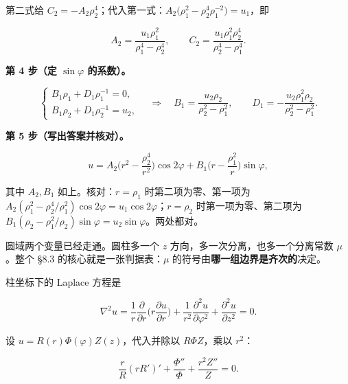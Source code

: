 \documentclass[11pt]{ctexart}
\let\origsubhdr\subhdr
\renewcommand{\subhdr}[1]{\par\needspace{3\baselineskip}\origsubhdr{#1}}
\let\orighdr\hdr
\renewcommand{\hdr}[2]{\par\needspace{6\baselineskip}\orighdr{#1}{#2}}
\begin{document}
第二式给 $C_2=-A_2\rho_2^4$；代入第一式：$A_2\big(\rho_1^2-\rho_2^4\rho_1^{-2}\big)=u_1$，即

\[
A_2=\frac{u_1\rho_1^2}{\rho_1^4-\rho_2^4},\qquad C_2=\frac{u_1\rho_1^2\rho_2^4}{\rho_2^4-\rho_1^4}.
\]

\textbf{第 4 步（定 $\sin\varphi$ 的系数）。}

\[
\begin{cases}
B_1\rho_1+D_1\rho_1^{-1}=0,\\[2pt]
B_1\rho_2+D_1\rho_2^{-1}=u_2,
\end{cases}
\quad\Longrightarrow\quad
B_1=\frac{u_2\rho_2}{\rho_2^2-\rho_1^2},\qquad D_1=-\frac{u_2\rho_1^2\rho_2}{\rho_2^2-\rho_1^2}.
\]

\textbf{第 5 步（写出答案并核对）。}

\[
u=A_2\Big(r^2-\frac{\rho_2^4}{r^2}\Big)\cos2\varphi
+B_1\Big(r-\frac{\rho_1^2}{r}\Big)\sin\varphi ,
\]

其中 $A_2,B_1$ 如上。核对：$r=\rho_1$ 时第二项为零、第一项为 $A_2(\rho_1^2-\rho_2^4/\rho_1^2)\cos2\varphi=u_1\cos2\varphi$；$r=\rho_2$ 时第一项为零、第二项为 $B_1(\rho_2-\rho_1^2/\rho_2)\sin\varphi=u_2\sin\varphi$。两处都对。


\label{sec:s5}

圆域两个变量已经走通。圆柱多一个 $z$ 方向，多一次分离，也多一个分离常数 $\mu$。整个 \S8.3 的核心就是一张判据表：$\mu$ 的符号由\textbf{哪一组边界是齐次的}决定。


柱坐标下的 Laplace 方程是

\begin{equation}
\nabla^2u=\frac1r\frac{\partial}{\partial r}\Big(r\frac{\partial u}{\partial r}\Big)+\frac1{r^2}\frac{\partial^2u}{\partial\varphi^2}+\frac{\partial^2u}{\partial z^2}=0 .
\label{eq:lapcyl}
\end{equation}

设 $u=R(r)\Phi(\varphi)Z(z)$，代入并除以 $R\Phi Z$，乘以 $r^2$：

\[
\frac{r}{R}(rR')'+\frac{\Phi''}{\Phi}+\frac{r^2Z''}{Z}=0 .
\]
\end{document}
